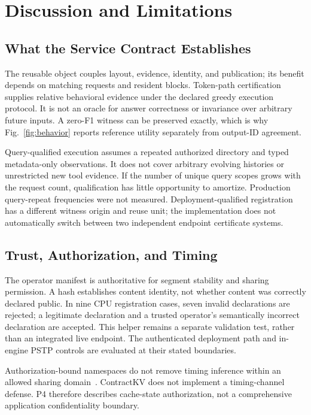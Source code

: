 \section{Discussion and Limitations}
\label{sec:discussion}

\subsection{What the Service Contract Establishes}
The reusable object couples layout, evidence, identity, and publication; its benefit depends on matching requests and resident blocks. Token-path certification supplies relative behavioral evidence under the declared greedy execution protocol. It is not an oracle for answer correctness or invariance over arbitrary future inputs. A zero-F1 witness can be preserved exactly, which is why Fig.~\ref{fig:behavior} reports reference utility separately from output-ID agreement.

Query-qualified execution assumes a repeated authorized directory and typed metadata-only observations. It does not cover arbitrary evolving histories or unrestricted new tool evidence. If the number of unique query scopes grows with the request count, qualification has little opportunity to amortize. Production query-repeat frequencies were not measured. Deployment-qualified registration has a different witness origin and reuse unit; the implementation does not automatically switch between two independent endpoint certificate systems.

\subsection{Trust, Authorization, and Timing}
The operator manifest is authoritative for segment stability and sharing permission. A hash establishes content identity, not whether content was correctly declared public. In nine CPU registration cases, seven invalid declarations are rejected; a legitimate declaration and a trusted operator's semantically incorrect declaration are accepted. This helper remains a separate validation test, rather than an integrated live endpoint. The authenticated deployment path and in-engine PSTP controls are evaluated at their stated boundaries.

Authorization-bound namespaces do not remove timing inference within an allowed sharing domain~\cite{iknow2025,auditing2025}. ContractKV does not implement a timing-channel defense. P4 therefore describes cache-state authorization, not a comprehensive application confidentiality boundary.

